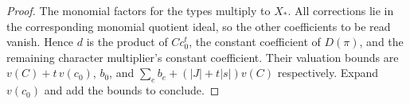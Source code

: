 \begin{proof}
The monomial factors for the types multiply to $X_\ast$. All corrections lie in the corresponding monomial quotient ideal, so the other coefficients to be read vanish. Hence $d$ is the product of $C c_0^t$, the constant coefficient of $D(\pi)$, and the remaining character multiplier's constant coefficient. Their valuation bounds are $v(C)+t\,v(c_0)$, $b_0$, and $\sum_e b_e+(|J|+t|s|)v(C)$ respectively. Expand $v(c_0)$ and add the bounds to conclude.
\end{proof}

